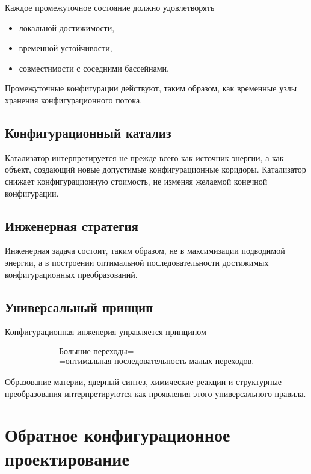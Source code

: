 Каждое промежуточное состояние должно удовлетворять

\begin{itemize}
\item локальной достижимости,
\item временной устойчивости,
\item совместимости
с соседними бассейнами.
\end{itemize}

Промежуточные конфигурации действуют, таким образом, как временные узлы хранения конфигурационного потока.

\section{Конфигурационный катализ}

Катализатор интерпретируется не прежде всего как источник энергии, а как объект, создающий новые допустимые конфигурационные коридоры. Катализатор снижает конфигурационную стоимость, не изменяя желаемой конечной конфигурации.

\section{Инженерная стратегия}

Инженерная задача состоит, таким образом, не в максимизации подводимой энергии, а в построении оптимальной последовательности достижимых конфигурационных преобразований.

\section{Универсальный принцип}

Конфигурационная инженерия управляется принципом

\[ \boxed{ \begin{gathered} \text{Большие переходы} = \\ = \text{оптимальная последовательность малых переходов.} \end{gathered} } \]

Образование материи, ядерный синтез, химические реакции и структурные преобразования интерпретируются как проявления этого универсального правила.

\chapter{Обратное конфигурационное проектирование}

